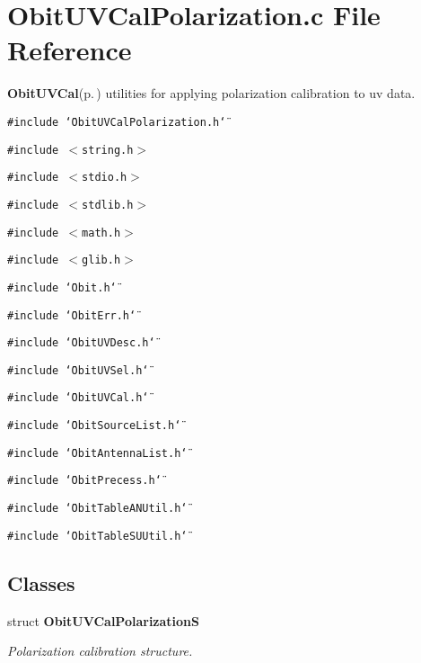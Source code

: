 \section{Obit\-UVCal\-Polarization.c File Reference}
\label{ObitUVCalPolarization_8c}
{\bf Obit\-UVCal}{\rm (p.\,\pageref{structObitUVCal})} utilities for applying polarization calibration to uv data. 

{\tt \#include \char`\"{}Obit\-UVCal\-Polarization.h\char`\"{}}\par
{\tt \#include $<$string.h$>$}\par
{\tt \#include $<$stdio.h$>$}\par
{\tt \#include $<$stdlib.h$>$}\par
{\tt \#include $<$math.h$>$}\par
{\tt \#include $<$glib.h$>$}\par
{\tt \#include \char`\"{}Obit.h\char`\"{}}\par
{\tt \#include \char`\"{}Obit\-Err.h\char`\"{}}\par
{\tt \#include \char`\"{}Obit\-UVDesc.h\char`\"{}}\par
{\tt \#include \char`\"{}Obit\-UVSel.h\char`\"{}}\par
{\tt \#include \char`\"{}Obit\-UVCal.h\char`\"{}}\par
{\tt \#include \char`\"{}Obit\-Source\-List.h\char`\"{}}\par
{\tt \#include \char`\"{}Obit\-Antenna\-List.h\char`\"{}}\par
{\tt \#include \char`\"{}Obit\-Precess.h\char`\"{}}\par
{\tt \#include \char`\"{}Obit\-Table\-ANUtil.h\char`\"{}}\par
{\tt \#include \char`\"{}Obit\-Table\-SUUtil.h\char`\"{}}\par
\subsection*{Classes}
\begin{CompactItemize}
\item 
struct {\bf Obit\-UVCal\-Polarization\-S}
\begin{CompactList}\small\item\em Polarization calibration structure. \item\end{CompactList}\end{CompactItemize}
